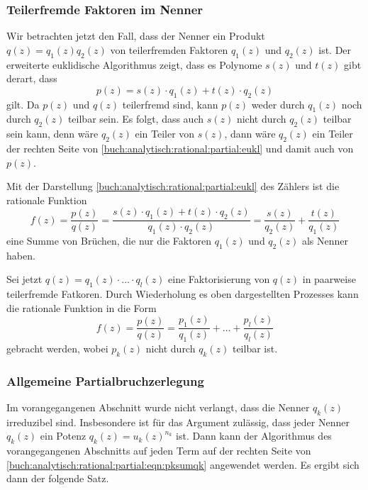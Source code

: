 \subsubsection{Teilerfremde Faktoren im Nenner}
Wir betrachten jetzt den Fall, dass der Nenner ein Produkt
$q(z) = q_1(z)q_2(z)$ von teilerfremden Faktoren $q_1(z)$ und $q_2(z)$
ist.
Der erweiterte euklidische Algorithmus zeigt, dass es Polynome
$s(z)$ und $t(z)$ gibt derart, dass
\begin{equation}
p(z)
=
s(z)\cdot q_1(z) + t(z)\cdot q_2(z)
\label{buch:analytisch:rational:partial:eukl}
\end{equation}
gilt.
Da $p(z)$ und $q(z)$ teilerfremd sind, kann $p(z)$ weder durch
$q_1(z)$ noch durch $q_2(z)$ teilbar sein.
Es folgt, dass auch
$s(z)$ nicht durch $q_2(z)$ teilbar sein kann, denn wäre $q_2(z)$
ein Teiler von $s(z)$, dann wäre $q_2(z)$ ein Teiler der rechten
Seite von
\eqref{buch:analytisch:rational:partial:eukl}
und damit auch von $p(z)$.

Mit der Darstellung
\eqref{buch:analytisch:rational:partial:eukl}
des Zählers ist die rationale Funktion
\[
f(z)
=
\frac{p(z)}{q(z)}
=
\frac{
s(z)\cdot q_1(z) + t(z)\cdot q_2(z)
}{q_1(z)\cdot q_2(z)}
=
\frac{s(z)}{q_2(z)}
+
\frac{t(z)}{q_1(z)}
\]
eine Summe von Brüchen, die nur die Faktoren $q_1(z)$ und $q_2(z)$
als Nenner haben.

Sei jetzt $q(z)=q_1(z)\cdot \ldots \cdot q_l(z)$ eine Faktorisierung
von $q(z)$ in paarweise teilerfremde Fatkoren.
Durch Wiederholung es oben dargestellten Prozesses kann die rationale
Funktion in die Form
\begin{equation}
f(z)
=
\frac{p(z)}{q(z)}
=
\frac{p_1(z)}{q_1(z)}
+
\ldots
+
\frac{p_l(z)}{q_l(z)}
\label{buch:analytisch:rational:partial:eqn:pksumqk}
\end{equation}
gebracht werden, wobei $p_k(z)$ nicht durch $q_k(z)$ teilbar ist.

%
%
\subsubsection{Allgemeine Partialbruchzerlegung}
Im vorangegangenen Abschnitt wurde nicht verlangt, dass die Nenner
$q_k(z)$ irreduzibel sind.
Insbesondere ist für das Argument zulässig, dass jeder Nenner $q_k(z)$
ein Potenz $q_k(z) = u_k(z)^{n_k}$ ist.
Dann kann der Algorithmus des vorangegangenen Abschnitts auf jeden
Term auf der rechten Seite von
\eqref{buch:analytisch:rational:partial:eqn:pksumqk}
angewendet werden.
Es ergibt sich dann der folgende Satz.

